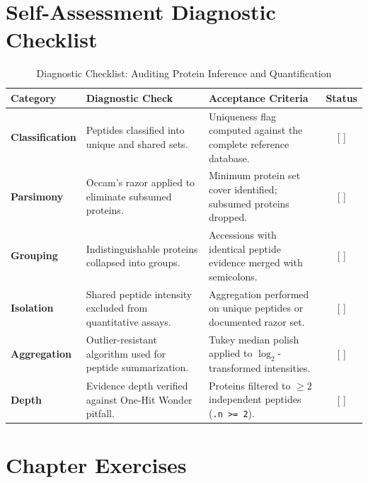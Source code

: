 \documentclass[11pt,twoside,openright]{book}
\begin{document}
\section{Self-Assessment Diagnostic Checklist}

\begin{table}[ht]
\centering
\caption{Diagnostic Checklist: Auditing Protein Inference and Quantification}
\label{tab:inference_checklist}
\small
\begin{tabularx}{\textwidth}{l p{5.5cm} X c}
\toprule
\textbf{Category} & \textbf{Diagnostic Check} & \textbf{Acceptance Criteria} & \textbf{Status} \\
\midrule
\textbf{Classification} & Peptides classified into unique and shared sets. & Uniqueness flag computed against the complete reference database. & [ ] \\
\addlinespace
\textbf{Parsimony} & Occam's razor applied to eliminate subsumed proteins. & Minimum protein set cover identified; subsumed proteins dropped. & [ ] \\
\addlinespace
\textbf{Grouping} & Indistinguishable proteins collapsed into groups. & Accessions with identical peptide evidence merged with semicolons. & [ ] \\
\addlinespace
\textbf{Isolation} & Shared peptide intensity excluded from quantitative assays. & Aggregation performed on unique peptides or documented razor set. & [ ] \\
\addlinespace
\textbf{Aggregation} & Outlier-resistant algorithm used for peptide summarization. & Tukey median polish applied to $\log_2$-transformed intensities. & [ ] \\
\addlinespace
\textbf{Depth} & Evidence depth verified against One-Hit Wonder pitfall. & Proteins filtered to $\ge 2$ independent peptides (\texttt{.n >= 2}). & [ ] \\
\bottomrule
\end{tabularx}
\end{table}

\FloatBarrier

\section{Chapter Exercises}
\end{document}
